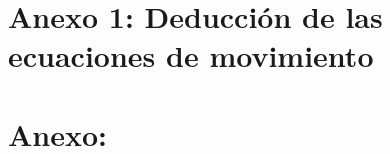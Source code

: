 \begin{appendix}
\chapter{Anexo 1: Deducci\'{o}n de las ecuaciones de movimiento }\label{AnexoA}


\chapter{Anexo:}


\end{appendix}
